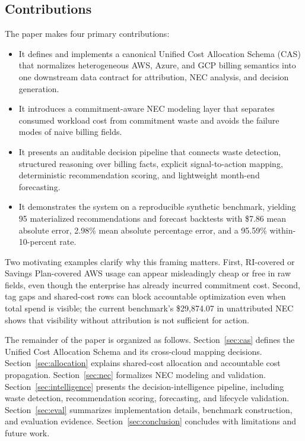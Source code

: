 \subsection*{Contributions}
The paper makes four primary contributions:
\begin{itemize}
    \item It defines and implements a canonical Unified Cost Allocation Schema (CAS) that normalizes heterogeneous AWS, Azure, and GCP billing semantics into one downstream data contract for attribution, NEC analysis, and decision generation.
    \item It introduces a commitment-aware NEC modeling layer that separates consumed workload cost from commitment waste and avoids the failure modes of naive billing fields.
    \item It presents an auditable decision pipeline that connects waste detection, structured reasoning over billing facts, explicit signal-to-action mapping, deterministic recommendation scoring, and lightweight month-end forecasting.
    \item It demonstrates the system on a reproducible synthetic benchmark, yielding 95 materialized recommendations and forecast backtests with \$7.86 mean absolute error, 2.98\% mean absolute percentage error, and a 95.59\% within-10-percent rate.
\end{itemize}

Two motivating examples clarify why this framing matters. First, RI-covered or Savings Plan-covered AWS usage can appear misleadingly cheap or free in raw fields, even though the enterprise has already incurred commitment cost. Second, tag gaps and shared-cost rows can block accountable optimization even when total spend is visible; the current benchmark's \$29{,}874.07 in unattributed NEC shows that visibility without attribution is not sufficient for action.

The remainder of the paper is organized as follows. Section~\ref{sec:cas} defines the Unified Cost Allocation Schema and its cross-cloud mapping decisions. Section~\ref{sec:allocation} explains shared-cost allocation and accountable cost propagation. Section~\ref{sec:nec} formalizes NEC modeling and validation. Section~\ref{sec:intelligence} presents the decision-intelligence pipeline, including waste detection, recommendation scoring, forecasting, and lifecycle validation. Section~\ref{sec:eval} summarizes implementation details, benchmark construction, and evaluation evidence. Section~\ref{sec:conclusion} concludes with limitations and future work.
